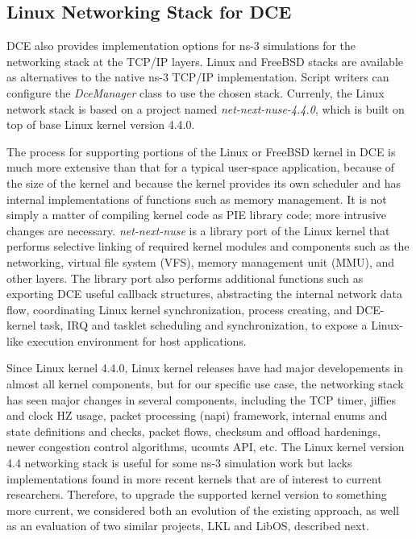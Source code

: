 \documentclass{sig-alternate}
\begin{document}
\subsection{Linux Networking Stack for DCE}
DCE also provides implementation options for ns-3 simulations for the networking stack at the TCP/IP layers.  Linux and FreeBSD stacks are available as alternatives to the native ns-3 TCP/IP implementation.
Script writers can configure the \textit{DceManager} class to use the chosen stack.
Currenly, the Linux network stack is based on a project named \textit{net-next-nuse-4.4.0}, which is built on top of base Linux kernel version 4.4.0.

The process for supporting portions of the Linux or FreeBSD kernel in DCE is
much more extensive than that for a typical user-space application, because of
the size of the kernel and because the kernel provides its own scheduler and has internal implementations of functions such as memory management.  It is not
simply a matter of compiling kernel code as PIE library code; more intrusive
changes are necessary. 
\textit{net-next-nuse} is a library 
port of the Linux kernel that performs selective linking of required kernel modules and components such as the networking, virtual file system (VFS), memory management unit (MMU), and other layers.  The library port also performs additional functions such as
exporting DCE useful callback structures, abstracting the internal network data flow, coordinating Linux kernel synchronization, 
process creating, and DCE-kernel task, IRQ and tasklet scheduling and synchronization, to expose a Linux-like execution environment for host applications. 

Since Linux kernel 4.4.0, Linux kernel releases have had major developements in almost all kernel components, but for our specific use case,
the networking stack has seen major changes in several components, including the TCP timer, jiffies and clock HZ usage, packet processing (napi) framework, internal enums and state definitions and checks, packet flows, checksum and
offload hardenings, newer congestion control algorithms, ucounts API, etc. 
The Linux kernel version 4.4 networking stack is useful for some ns-3 simulation work but lacks implementations found in more recent kernels that are of interest to current researchers.  Therefore, to upgrade the supported kernel version to something more current, we considered both an evolution of the existing approach, as well as an evaluation of two similar projects, LKL and LibOS, described next. 
\end{document}
